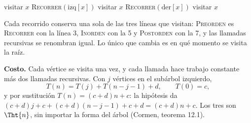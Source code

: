 \documentclass[11pt,letterpaper]{article}
\begin{document}
\begin{algorithm}[H]
\caption{\textsc{Recorrer}$(x)$: los tres recorridos de un árbol
         binario}
\label{alg:arbol-recorridos}
\begin{algorithmic}[1]
    \State visitar $x$ 
    \State \textsc{Recorrer}$(\text{izq}[x])$
    \State visitar $x$ 
    \State \textsc{Recorrer}$(\text{der}[x])$
    \State visitar $x$ 
  \EndIf
\EndProcedure
\end{algorithmic}
\end{algorithm}

Cada recorrido conserva una sola de las tres líneas que visitan:
\textsc{Preorden} es \textsc{Recorrer} con la línea 3,
\textsc{Inorden} con la 5 y \textsc{Postorden} con la 7, y las
llamadas recursivas se renombran igual. Lo único que cambia es en qué
momento se visita la raíz.

\textbf{Costo.} Cada vértice se visita una vez, y cada llamada hace
trabajo constante más dos llamadas recursivas. Con $j$ vértices en el
subárbol izquierdo,
\[
  T(n) = T(j) + T(n - j - 1) + d , \qquad T(0) = c ,
\]
y por sustitución $T(n) = (c + d)n + c$: la hipótesis da
$(c + d)j + c + (c + d)(n - j - 1) + c + d = (c + d)n + c$. Los tres
son $\Tht{n}$, sin importar la forma del árbol (Cormen, teorema
12.1).
\end{document}
